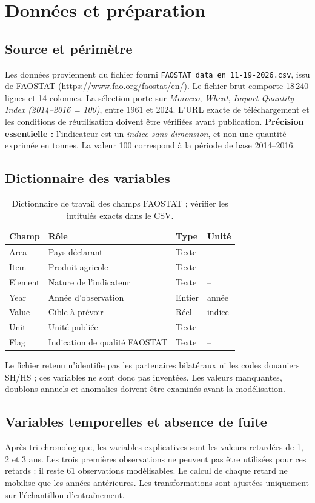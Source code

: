 \documentclass[11pt,a4paper]{report}
\begin{document}
\chapter{Données et préparation}
\section{Source et périmètre}
Les données proviennent du fichier fourni \texttt{FAOSTAT\_data\_en\_11-19-2026.csv}, issu de FAOSTAT (\url{https://www.fao.org/faostat/en/}). Le fichier brut comporte 18\,240 lignes et 14 colonnes. La sélection porte sur \textit{Morocco}, \textit{Wheat}, \textit{Import Quantity Index (2014--2016 = 100)}, entre 1961 et 2024. L'URL exacte de téléchargement et les conditions de réutilisation doivent être vérifiées avant publication.
\textbf{Précision essentielle :} l'indicateur est un \emph{indice sans dimension}, et non une quantité exprimée en tonnes. La valeur 100 correspond à la période de base 2014--2016.
\section{Dictionnaire des variables}
\begin{table}[H]\centering\small\begin{tabularx}{\textwidth}{lXll}\toprule Champ & Rôle & Type & Unité\\\midrule Area & Pays déclarant & Texte & --\\ Item & Produit agricole & Texte & --\\ Element & Nature de l'indicateur & Texte & --\\ Year & Année d'observation & Entier & année\\ Value & Cible à prévoir & Réel & indice\\ Unit & Unité publiée & Texte & --\\ Flag & Indication de qualité FAOSTAT & Texte & --\\\bottomrule\end{tabularx}\caption{Dictionnaire de travail des champs FAOSTAT ; vérifier les intitulés exacts dans le CSV.}\end{table}
Le fichier retenu n'identifie pas les partenaires bilatéraux ni les codes douaniers SH/HS ; ces variables ne sont donc pas inventées. Les valeurs manquantes, doublons annuels et anomalies doivent être examinés avant la modélisation.
\section{Variables temporelles et absence de fuite}
Après tri chronologique, les variables explicatives sont les valeurs retardées de 1, 2 et 3 ans. Les trois premières observations ne peuvent pas être utilisées pour ces retards : il reste 61 observations modélisables. Le calcul de chaque retard ne mobilise que les années antérieures. Les transformations sont ajustées uniquement sur l'échantillon d'entraînement.
\end{document}
